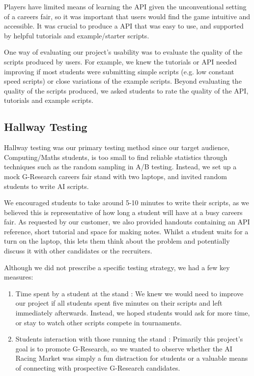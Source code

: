 Players have limited means of learning the API given the unconventional setting of a careers fair, so it was important that users would find the game intuitive and accessible. It was crucial to produce a API that was easy to use, and supported by helpful tutorials and example/starter scripts. 

One way of evaluating our project's usability was to evaluate the quality of the scripts produced by users. For example, we knew the tutorials or API needed improving if most students were submitting simple scripts (e.g. low constant speed scripts) or close variations of the example scripts. Beyond evaluating the quality of the scripts produced, we asked students to rate the quality of the API, tutorials and example scripts.

\subsection{Hallway Testing}

Hallway testing was our primary testing method since our target audience, Computing/Maths students, is too small to find reliable statistics through techniques such as the random sampling in A/B testing. Instead, we set up a mock G-Research careers fair stand with two laptops, and invited random students to write AI scripts.

We encouraged students to take around 5-10 minutes to write their scripts, as we believed this is representative of how long a student will have at a busy careers fair. As requested by our customer, we also provided handouts containing an API reference, short tutorial and space for making notes. Whilst a student waits for a turn on the laptop, this lets them think about the problem and potentially discuss it with other candidates or the recruiters. 

Although we did not prescribe a specific testing strategy, we had a few key measures:
\vspace*{-6mm}
\begin{enumerate} \itemsep -1pt 
\item Time spent by a student at the stand : We knew we would need to improve our project if all students spent five minutes on their scripts and left immediately afterwards. Instead, we hoped students would ask for more time, or stay to watch other scripts compete in tournaments.
\item Students interaction with those running the stand : Primarily this project's goal is to promote G-Research, so we wanted to observe whether the AI Racing Market was simply a fun distraction for students or a valuable means of connecting with prospective G-Research candidates.
\end{enumerate}

